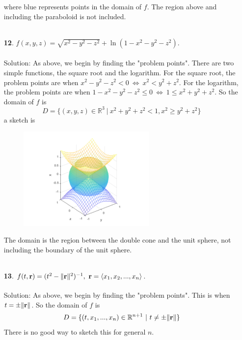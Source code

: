 \documentclass[12pt]{amsbook}
\newcommand{\la}{\langle}
\newcommand{\ra}{\rangle}
\begin{document}
\begin{enumerate}
\begin{center}
  \end{center}
  where blue represents points in the domain of $f$. The region above and including the paraboloid is not included. 
  \\
  \\
  \item[{\small\bf 12}.] $f(x,y,z)=\sqrt{x^2-y^2-z^2}+\ln(1-x^2-y^2-z^2)$.
  \\
  \\
  {\sc Solution}: As above, we begin by finding the "problem points". There are two simple functions, the square root and the logarithm. For the square root, the problem  points are when $x^2-y^2-z^2 < 0 \ \Leftrightarrow \ x^2<y^2+z^2$. For the logarithm, the problem points are when $1-x^2-y^2-z^2 \leq 0 \ \Leftrightarrow \ 1 \leq x^2+y^2+z^2$. So the domain of $f$ is
  $$D=\{(x,y,z)\in \mathbb{R}^3 \ | \  x^2+y^2+z^2<1,  x^2\geq y^2+z^2 \}$$ 
  a sketch is
  \begin{center}
  \includegraphics[width=3.5in,height=2.0in]{3_1_12.png}
  \end{center}
  The domain is the region between the double cone and the unit sphere, not including the boundary of the unit sphere.  
  \\
  \\
  \item[{\small\bf 13}.] $f(t,{\bf r})=(t^2-\|{\bf r}\|^2)^{-1}, \ {\bf r}=\la x_1,x_2,...,x_n \ra$.
  \\
  \\
  {\sc Solution}: As above, we begin by finding the "problem points". This is when $t= \pm \|{\bf r}\|$. So the domain of $f$ is
  $$D=\{(t,x_1,...,x_n)\in \mathbb{R}^{n+1} \ | \  t \neq \pm \|{\bf r}\| \}$$ 
There is no good way to sketch this for general $n$.
  \\
  \\
\end{enumerate}
\end{document}
